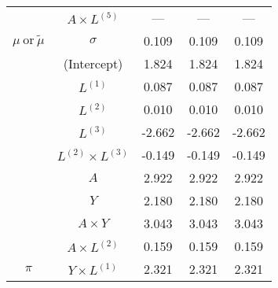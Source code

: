 \begin{table}
\begin{minipage}[t]{0.5\textwidth}
\begin{tabular}[t]{|>{}c|c|c|c|>{}c|}
\cline{2-5}
 & $A \times L^{(5)}$ & --- & --- & ---\\
\cline{2-5}
\multirow{-15}{*}{\centering\arraybackslash $\mu~\text{or}~\tilde\mu$} & $\sigma$ & 0.109 & 0.109 & 0.109\\
\cline{1-5}
 & (Intercept) & 1.824 & 1.824 & 1.824\\
\cline{2-5}
 & $L^{(1)}$ & 0.087 & 0.087 & 0.087\\
\cline{2-5}
 & $L^{(2)}$ & 0.010 & 0.010 & 0.010\\
\cline{2-5}
 & $L^{(3)}$ & -2.662 & -2.662 & -2.662\\
\cline{2-5}
 & $L^{(2)} \times L^{(3)}$ & -0.149 & -0.149 & -0.149\\
\cline{2-5}
 & $A$ & 2.922 & 2.922 & 2.922\\
\cline{2-5}
 & $Y$ & 2.180 & 2.180 & 2.180\\
\cline{2-5}
 & $A\times Y$ & 3.043 & 3.043 & 3.043\\
\cline{2-5}
 & $A \times L^{(2)}$ & 0.159 & 0.159 & 0.159\\
\cline{2-5}
\multirow{-10}{*}{\centering\arraybackslash $\pi$} & $Y \times L^{(1)}$ & 2.321 & 2.321 & 2.321\\
\hline
\end{tabular}
\end{minipage}
\begin{minipage}[t]{0.5\textwidth}


\end{minipage}
\end{table}
